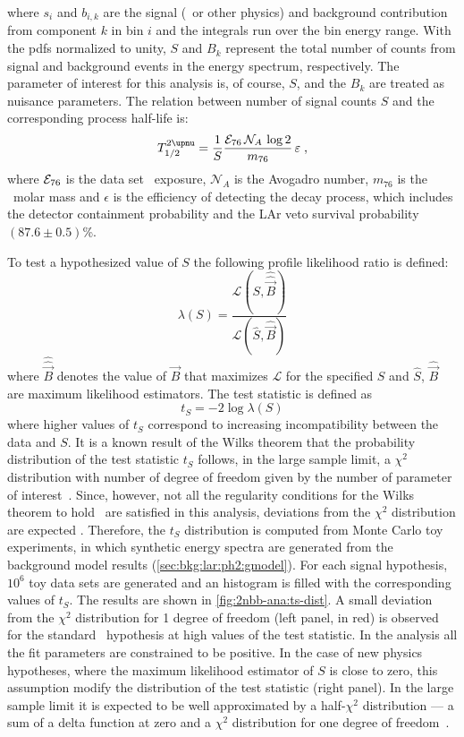 where $s_i$ and $b_{i,k}$ are the signal (\nnbb\ or other physics) and background
contribution from component $k$ in bin $i$ and the integrals run over the bin energy
range. With the pdfs normalized to unity, $S$ and $B_k$ represent the total number of
counts from signal and background events in the energy spectrum, respectively. The
parameter of interest for this analysis is, of course, $S$, and the $B_k$ are treated as
nuisance parameters. The relation between number of signal counts $S$ and the
corresponding process half-life is:
\begin{equation}\label{eq:2nbb:halflife}
  \thalftwoM = \frac{1}{S} \frac{\expoM_{76}\, \mathcal{N}_A\, \log2}{m_{76}}\, \epsilon \;,
\end{equation}
where $\mathcal{E}_{76}$ is the data set \gesix\ exposure, $\mathcal{N}_A$ is the Avogadro number,
$m_{76}$ is the \gesix\ molar mass and $\epsilon$ is the efficiency of detecting the decay
process, which includes the detector containment probability and the LAr veto survival
probability $(87.6 \pm 0.5)$\%.

To test a hypothesized value of $S$ the following profile likelihood ratio is defined:
\[
  \lambda(S) = \frac{\mathcal{L}(S, \hat{\hat{\vec{B}}})}{\mathcal{L}(\hat{S}, \hat{\vec{B}})}
\]
where $\hat{\hat{\vec{B}}}$ denotes the value of $\vec{B}$ that maximizes $\mathcal{L}$
for the specified $S$ and $\hat{S}$, $\hat{\vec{B}}$ are maximum likelihood
estimators. The test statistic is defined as
\[
  t_S = -2\log\lambda(S)
\]
where higher values of $t_S$ correspond to increasing incompatibility between the data and
$S$. It is a known result of the Wilks theorem that the probability distribution of the
test statistic $t_S$ follows, in the large sample limit, a $\chi^2$ distribution with
number of degree of freedom given by the number of parameter of interest~\cite{Cowan2011}.
Since, however, not all the regularity conditions for the Wilks theorem to
hold~\cite{Algeri2020} are satisfied in this analysis, deviations from the $\chi^2$
distribution are expected . Therefore, the $t_S$ distribution is computed
from Monte Carlo toy experiments, in which synthetic energy spectra are generated from the
background model results (\cref{sec:bkg:lar:ph2:gmodel}). For each signal hypothesis,
$10^6$ toy data sets are generated and an histogram is filled with the corresponding
values of $t_S$. The results are shown in \cref{fig:2nbb-ana:ts-dist}. A small deviation
from the $\chi^2$ distribution for 1 degree of freedom (left panel, in red) is observed
for the standard \nnbb\ hypothesis at high values of the test statistic. In the analysis
all the fit parameters are constrained to be positive. In the case of new physics
hypotheses, where the maximum likelihood estimator of $S$ is close to zero, this
assumption modify the distribution of the test statistic (right panel). In the large
sample limit it is expected to be well approximated by a half-$\chi^2$ distribution --- a
sum of a delta function at zero and a $\chi^2$ distribution for one degree of
freedom~\cite{Cowan2011}.


